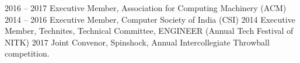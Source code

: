 
\begin{cvskills}
  \cvskill
    {2016 – 2017} %
    {Executive Member, Association for Computing Machinery (ACM)} %
  \cvskill
    {2014 – 2016} %
    {Executive Member, Computer Society of India (CSI)} %
  \cvskill
    {2014} %
    {Executive Member, Technites, Technical Committee, ENGINEER (Annual Tech Festival of NITK)} %
  \cvskill
    {2017} %
    {Joint Convenor, Spinshock, Annual Intercollegiate Throwball competition.} %
\end{cvskills}
